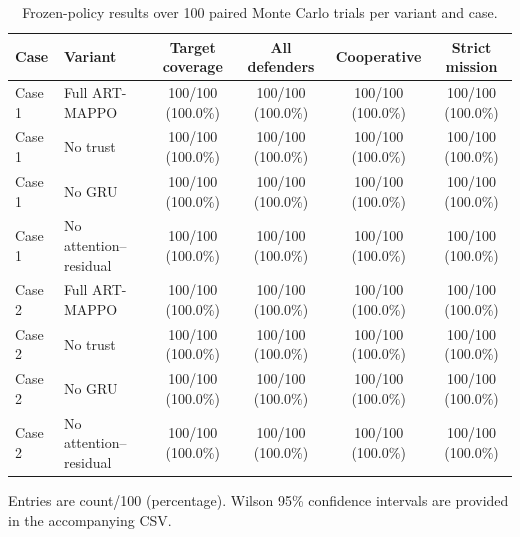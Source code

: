 \begin{table}[!t]
\centering
\small
\caption{Frozen-policy results over 100 paired Monte Carlo trials per variant and case.}
\label{tab:ablation_success_n100}
\renewcommand{\arraystretch}{1.12}
\begin{tabular}{llcccc}
\toprule
Case & Variant & Target coverage & All defenders & Cooperative & Strict mission \\
\midrule
Case 1 & Full ART-MAPPO & 100/100 (100.0\%) & 100/100 (100.0\%) & 100/100 (100.0\%) & 100/100 (100.0\%) \\
Case 1 & No trust & 100/100 (100.0\%) & 100/100 (100.0\%) & 100/100 (100.0\%) & 100/100 (100.0\%) \\
Case 1 & No GRU & 100/100 (100.0\%) & 100/100 (100.0\%) & 100/100 (100.0\%) & 100/100 (100.0\%) \\
Case 1 & No attention--residual & 100/100 (100.0\%) & 100/100 (100.0\%) & 100/100 (100.0\%) & 100/100 (100.0\%) \\
Case 2 & Full ART-MAPPO & 100/100 (100.0\%) & 100/100 (100.0\%) & 100/100 (100.0\%) & 100/100 (100.0\%) \\
Case 2 & No trust & 100/100 (100.0\%) & 100/100 (100.0\%) & 100/100 (100.0\%) & 100/100 (100.0\%) \\
Case 2 & No GRU & 100/100 (100.0\%) & 100/100 (100.0\%) & 100/100 (100.0\%) & 100/100 (100.0\%) \\
Case 2 & No attention--residual & 100/100 (100.0\%) & 100/100 (100.0\%) & 100/100 (100.0\%) & 100/100 (100.0\%) \\
\bottomrule
\end{tabular}
\vspace{1mm}\parbox{0.98\linewidth}{\footnotesize Entries are count/100 (percentage). Wilson 95\% confidence intervals are provided in the accompanying CSV.}
\end{table}
